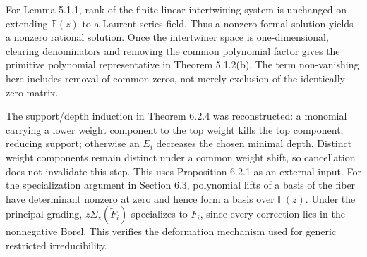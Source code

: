 \documentclass[10pt]{article}
\begin{document}
For Lemma 5.1.1, rank of the finite linear intertwining system is unchanged on extending \(\mathbb F(z)\) to a Laurent-series field. Thus a nonzero formal solution yields a nonzero rational solution. Once the intertwiner space is one-dimensional, clearing denominators and removing the common polynomial factor gives the primitive polynomial representative in Theorem 5.1.2(b). The term non-vanishing here includes removal of common zeros, not merely exclusion of the identically zero matrix.\par
The support/depth induction in Theorem 6.2.4 was reconstructed: a monomial carrying a lower weight component to the top weight kills the top component, reducing support; otherwise an \(E_i\) decreases the chosen minimal depth. Distinct weight components remain distinct under a common weight shift, so cancellation does not invalidate this step. This uses Proposition 6.2.1 as an external input. For the specialization argument in Section 6.3, polynomial lifts of a basis of the fiber have determinant nonzero at zero and hence form a basis over \(\mathbb F(z)\). Under the principal grading, \(z\Sigma_z(\widetilde F_i)\) specializes to \(F_i\), since every correction lies in the nonnegative Borel. This verifies the deformation mechanism used for generic restricted irreducibility.\par
\end{document}
